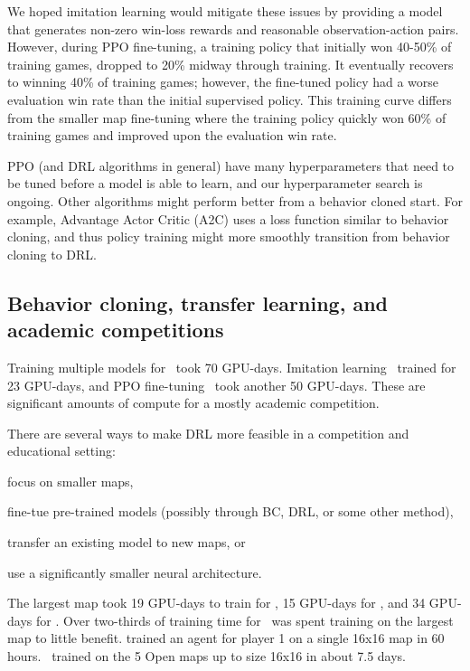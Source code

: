 \documentclass{article}
\begin{document}
We hoped imitation learning would mitigate these issues by providing a model that
generates non-zero win-loss rewards and reasonable observation-action pairs.
However, during PPO fine-tuning, a training policy that initially won 40-50\% of
training games, dropped to 20\% midway through training. It eventually recovers to
winning 40\% of training games; however, the fine-tuned policy had a worse evaluation
win rate than the initial supervised policy. This training curve differs from the
smaller map fine-tuning where the training policy quickly won 60\% of
training games and improved upon the evaluation win rate.

PPO (and DRL algorithms in general) have many hyperparameters that need to be tuned
before a model is able to learn, and our hyperparameter search is ongoing. Other 
algorithms might perform better from a behavior cloned start. For example,
Advantage Actor Critic (A2C) \citep{DBLP:journals/corr/MnihBMGLHSK16} uses a loss
function similar to behavior cloning, and thus policy training might more smoothly
transition from behavior cloning to DRL.

\subsection{Behavior cloning, transfer learning, and academic competitions}
Training multiple models for \agentName\ took 70 GPU-days. Imitation learning \bcAgent\
trained for 23 GPU-days, and PPO fine-tuning \bcPPOAgent\ took another 50 GPU-days. 
These are significant amounts of compute for a mostly academic competition.

There are several ways to make DRL more feasible in a competition and educational setting:
\begin{inparaenum}[(1)]
    \item focus on smaller maps,
    \item fine-tue pre-trained models (possibly through BC, DRL, or some other method),
    \item transfer an existing model to new maps, or
    \item use a significantly smaller neural architecture.
\end{inparaenum}
The largest map took 19 GPU-days to train for \agentName, 15 GPU-days for \bcAgent, and
34 GPU-days for \bcPPOAgent. Over two-thirds of training time for \bcPPOAgent\ was spent
training on the largest map to little benefit. \citet{DBLP:journals/corr/abs-2105-13807}
trained an agent for player 1 on a single 16x16 map in 60 hours. \bcPPOAgent\ trained
on the 5 Open maps up to size 16x16 in about 7.5 days.
\end{document}
